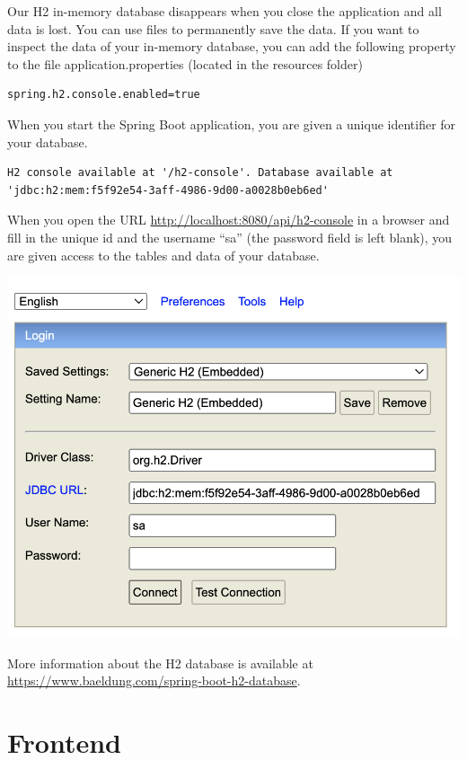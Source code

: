 \begin{tcolorbox}[colback=blue!5!white,colframe=blue!75!black,title=H2 database]
Our H2 in-memory database disappears when you close the application and all data is lost.
You can use files to permanently save the data.  If you want to inspect the data of your in-memory database, you can add the following property to the file application.properties (located in the resources folder)
\begin{lstlisting}[frame=single]
spring.h2.console.enabled=true
\end{lstlisting}
When you start the Spring Boot application, you are given a unique identifier for your database.  
\begin{lstlisting}[frame=single]
H2 console available at '/h2-console'. Database available at 'jdbc:h2:mem:f5f92e54-3aff-4986-9d00-a0028b0eb6ed'
\end{lstlisting}
When you open the URL \url{http://localhost:8080/api/h2-console} in a browser and fill in the unique id and the username ``sa'' (the password field is left blank),  you are given access to the tables and data of your database. 

\includegraphics[width=\textwidth]{./images/chapter2/h2-database.png} 

More information about the H2 database is available at \url{https://www.baeldung.com/spring-boot-h2-database}.
\end{tcolorbox}

\section{Frontend}

